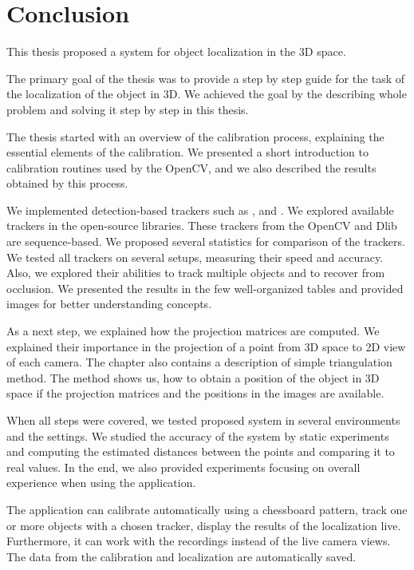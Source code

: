 \chapter*{Conclusion}

This thesis proposed a system for object localization in the 3D space.

The primary goal of the thesis was to provide a step by step guide for the task
of the localization of the object in 3D. We achieved the goal by the describing
whole problem and solving it step by step in this thesis.

The thesis started with an overview of the calibration process, explaining the
essential elements of the calibration. We presented a short introduction to
calibration routines used by the OpenCV, and we also described the results
obtained by this process.

We implemented detection-based trackers such as \simback{}, \hsv{} and \patt{}. We
explored available trackers in the open-source libraries. These trackers from
the OpenCV and Dlib are sequence-based. We proposed several statistics for
comparison of the trackers. We tested all trackers on several setups, measuring their
speed and accuracy. Also, we explored their abilities to track multiple objects
and to recover from occlusion. We presented the results in the few
well-organized tables and provided images for better understanding concepts.

As a next step, we explained how the projection matrices are computed. We
explained their importance in the projection of a point from 3D space to 2D
view of each camera. The chapter also contains a description of simple
triangulation method.  The method shows us, how to obtain a position of the
object in 3D space if the projection matrices and the positions in the images
are available.

When all steps were covered, we tested proposed system in several environments
and the settings. We studied the accuracy of the system by static experiments
and computing the estimated distances between the points and comparing it to
real values. In the end, we also provided experiments focusing on overall
experience when using the application.

The application can calibrate automatically using a chessboard pattern, track
one or more objects with a chosen tracker, display the results of the localization
live. Furthermore, it can work with the recordings instead of the live camera views.
The data from the calibration and localization are automatically saved.

